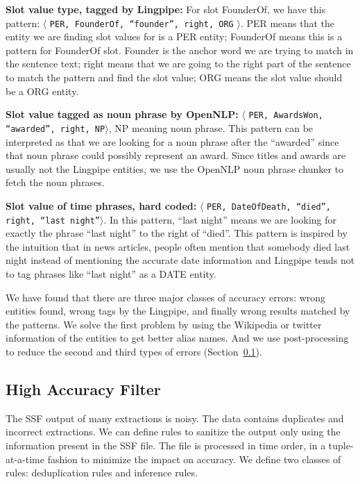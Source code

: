 \textbf{Slot value type, tagged by Lingpipe:} For slot FounderOf, we have this
pattern: $\langle$ \texttt{PER, FounderOf, ``founder'', right, ORG} $\rangle$. PER means 
that the entity we are finding slot values for is a PER entity; FounderOf 
means this is a pattern for FounderOf slot. Founder is the anchor word we are 
trying to match in the sentence text; right means that we are going to the 
right part of the sentence to match the pattern and find the slot value; ORG 
means the slot value should be a ORG entity.

\textbf{Slot value tagged as noun phrase by OpenNLP:} $\langle$ \texttt{PER, AwardsWon, ``awarded'', 
right, NP}$\rangle$, NP meaning noun phrase. This pattern can be interpreted 
as that we are looking for a noun phrase after the ``awarded'' since that noun 
phrase could possibly represent an award. Since titles and awards are usually 
not the Lingpipe entities, we use the OpenNLP noun phrase chunker to fetch the 
noun phrases.

\textbf{Slot value of time phrases, hard coded:} $\langle$ \texttt{PER, DateOfDeath, ``died'', right, 
``last night''}$\rangle$. In this pattern, ``last night'' means we are looking for 
exactly the phrase ``last night'' to the right of ``died''. This pattern is 
inspired by the intuition that in news articles, people often mention that 
somebody died last night instead of mentioning the accurate date information 
and Lingpipe tends not to tag phrases like ``last night'' as a DATE entity. 

We have found that there are three major classes of accuracy errors:
wrong entities found, wrong tags by the Lingpipe, and finally wrong results matched 
by the patterns. We solve the first problem by using the Wikipedia or twitter 
information of the entities to get better alias names. And we use
post-processing to reduce the second and third types of errors (Section~\ref{section:highAccuracyFilter}).

\subsection{High Accuracy Filter}
\label{section:highAccuracyFilter}

The SSF output of many extractions is noisy. The data contains duplicates and 
incorrect extractions. We can define rules to sanitize the output only using 
the information present in the SSF file. The file is processed in time order, 
in a tuple-at-a-time fashion to minimize the impact on accuracy. We define 
two classes of rules: deduplication rules and inference rules.


